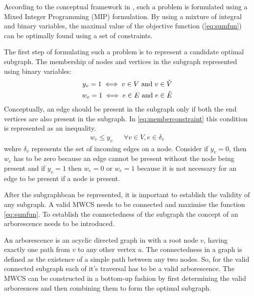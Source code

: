 \documentclass[msthesis.tex]{subfiles}
\begin{document}
According to the conceptual framework in \cite{DBLP:journals/corr/LobodaAS16}, such a problem is formulated using a Mixed Integer Programming (MIP) formulation. By using  a mixture of integral and binary variables, the maximal value of the objective function (\autoref{eq:sumfun}) can be optimally found using a set of constraints.

The first step of formulating such a problem is to represent a candidate optimal subgraph. The membership of nodes and vertices in the subgraph represented using binary variables:
\begin{align}
    \label{eq:y_v}
    y_v = 1  \iff v \in V  \textrm{ and } v \in \Tilde{V} \\
    \label{eq:w_e}
    w_e =1  \iff e \in E  \textrm{  and }  e \in \Tilde{E}
\end{align}
Conceptually, an edge should be present in the subgraph only if both the end vertices are also present in the subgraph. In \autoref{eq:memberconstraint} this condition is represented as an inequality.
\begin{align}
    \label{eq:memberconstraint}
    w_e \leq y_v && \forall v \in V, e \in \delta_{v}
\end{align}
wehre $\delta_{v}$ represents the set of incoming edges on a node. Consider if $y_v = 0$, then $w_e$ has to be zero because an edge cannot be present without the node being present and if $y_v = 1$ then $w_e = 0$ or $w_e = 1$ because it is not necessary for an edge to be present if a node is present.

After the subgraphbcan be represented, it is important to establish the validity of any subgraph. A valid MWCS needs to be connected and maximise the function \autoref{eq:sumfun}. To establish the connectedness of the subgraph the concept of an arborescence needs to be introduced.

An arborescence is an acyclic directed graph in with a root node $v$, having exactly one path from $v$ to any other vertex $u$. The connectedness in a graph is defined as the existence of a simple path between any two nodes. So, for the valid connected subgraph each of it's traversal has to be a valid arborescence. The MWCS can be constructed in a bottom-up fashion by first determining the valid arboresnces and then combining them to form the optimal subgraph.
\end{document}
